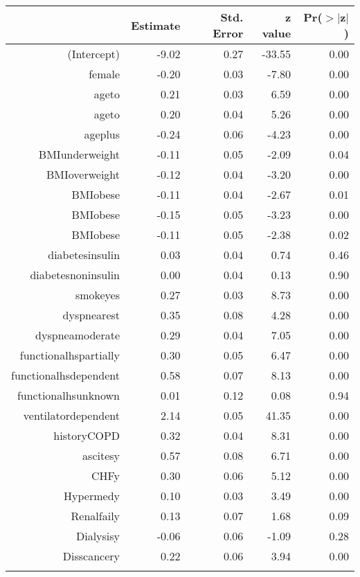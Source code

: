 \bigskip\bigskip
\centering
\begin{tabular}{rrrrr}
  \hline
 & Estimate & Std. Error & z value & Pr($>$$|$z$|$) \\ 
  \hline
(Intercept) & -9.02 & 0.27 & -33.55 & 0.00 \\ 
  female & -0.20 & 0.03 & -7.80 & 0.00 \\ 
  age\-65\-to\-74 & 0.21 & 0.03 & 6.59 & 0.00 \\ 
  age\-75\-to\-84 & 0.20 & 0.04 & 5.26 & 0.00 \\ 
  age\-85\-plus & -0.24 & 0.06 & -4.23 & 0.00 \\ 
  BMI\-underweight & -0.11 & 0.05 & -2.09 & 0.04 \\ 
  BMI\-overweight & -0.12 & 0.04 & -3.20 & 0.00 \\ 
  BMI\-obese\-1 & -0.11 & 0.04 & -2.67 & 0.01 \\ 
  BMI\-obese\-2 & -0.15 & 0.05 & -3.23 & 0.00 \\ 
  BMI\-obese\-3 & -0.11 & 0.05 & -2.38 & 0.02 \\ 
  diabetes\-insulin & 0.03 & 0.04 & 0.74 & 0.46 \\ 
  diabetes\-noninsulin & 0.00 & 0.04 & 0.13 & 0.90 \\ 
  smoke\-yes & 0.27 & 0.03 & 8.73 & 0.00 \\ 
  dyspnea\-rest & 0.35 & 0.08 & 4.28 & 0.00 \\ 
  dyspnea\-moderate & 0.29 & 0.04 & 7.05 & 0.00 \\ 
  functional\-hs\-partially & 0.30 & 0.05 & 6.47 & 0.00 \\ 
  functional\-hs\-dependent & 0.58 & 0.07 & 8.13 & 0.00 \\ 
  functional\-hs\-unknown & 0.01 & 0.12 & 0.08 & 0.94 \\ 
  ventilator\-dependent & 2.14 & 0.05 & 41.35 & 0.00 \\ 
  history\-COPD & 0.32 & 0.04 & 8.31 & 0.00 \\ 
  ascites\-y & 0.57 & 0.08 & 6.71 & 0.00 \\ 
  CHF\-y & 0.30 & 0.06 & 5.12 & 0.00 \\ 
  Hyper\-med\-y & 0.10 & 0.03 & 3.49 & 0.00 \\ 
  Renal\-fail\-y & 0.13 & 0.07 & 1.68 & 0.09 \\ 
  Dialysis\-y & -0.06 & 0.06 & -1.09 & 0.28 \\ 
  Diss\-cancer\-y & 0.22 & 0.06 & 3.94 & 0.00 \\ 
$$
\end{tabular}
